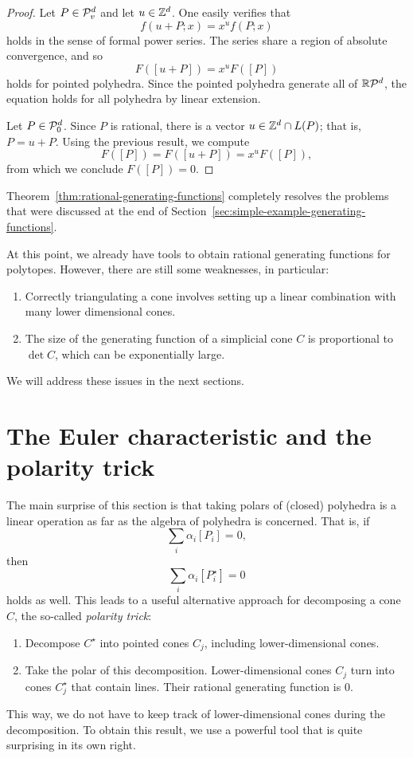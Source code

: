 \begin{proof}
  Let $P \in \mathcal{P}_v^d$ and let $u \in \mathbb{Z}^d$.
  One easily verifies that
  \[
    f(u+P;x) = x^u f(P;x)
  \]
  holds in the sense of formal power series.
  The series share a region of absolute convergence, and so
  \[
    F([u + P]) = x^u F([P])
  \]
  holds for pointed polyhedra.
  Since the pointed polyhedra generate all of $\mathbb{R}\mathcal{P}^d$,
  the equation holds for all polyhedra by linear extension.

  Let $P \in \mathcal{P}_0^d$. Since $P$ is rational, there is a vector $u \in \mathbb{Z}^d \cap L(P)$; that is, $P = u + P$.
  Using the previous result, we compute
  \[
    F([P]) = F([u + P]) = x^u F([P]),
  \]
  from which we conclude $F([P]) = 0$.
\end{proof}

Theorem~\ref{thm:rational-generating-functions} completely resolves
the problems that were discussed at the end of Section~\ref{sec:simple-example-generating-functions}.

At this point, we already have tools to obtain rational generating functions for polytopes.
However, there are still some weaknesses, in particular:
\begin{enumerate}
  \item Correctly triangulating a cone involves setting up a linear combination with many lower dimensional cones.

  \item The size of the generating function of a simplicial cone $C$ is proportional to $\det C$,
    which can be exponentially large.
\end{enumerate}
We will address these issues in the next sections.




\section{The Euler characteristic and the polarity trick}

The main surprise of this section is that taking polars of (closed) polyhedra is a linear operation
as far as the algebra of polyhedra is concerned.
That is, if
\[
  \sum_i \alpha_i [P_i] = 0,
\]
then
\[
  \sum_i \alpha_i [P_i^\star] = 0
\]
holds as well.
This leads to a useful alternative approach for decomposing a cone $C$,
the so-called \emph{polarity trick}:
\begin{enumerate}
  \item Decompose $C^\star$ into pointed cones $C_j$, including lower-dimensional cones.

  \item Take the polar of this decomposition.
    Lower-dimensional cones $C_j$ turn into cones $C_j^\star$ that contain lines.
    Their rational generating function is $0$.
\end{enumerate}
This way, we do not have to keep track of lower-dimensional cones during the decomposition.
To obtain this result, we use a powerful tool that is quite surprising in its own right.

